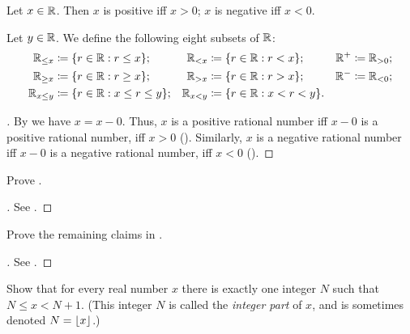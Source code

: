 \begin{ac}\label{i:ac:5.4.3}
  Let \(x \in \mathbb{R}\).
  Then \(x\) is positive iff \(x > 0\);
  \(x\) is negative iff \(x < 0\).

  Let \(y \in \mathbb{R}\).
  We define the following eight subsets of \(\mathbb{R}\):
  \begin{align*}
    \R_{\leq x}   & \coloneqq \set{r \in \R : r \leq x};        & \R_{< x}   & \coloneqq \set{r \in \R : r < x};     & \R^+ & \coloneqq \R_{> 0}; \\
    \R_{\geq x}   & \coloneqq \set{r \in \R : r \geq x};        & \R_{> x}   & \coloneqq \set{r \in \R : r > x};     & \R^- & \coloneqq \R_{< 0}; \\
    \R_{x \leq y} & \coloneqq \set{r \in \R : x \leq r \leq y}; & \R_{x < y} & \coloneqq \set{r \in \R : x < r < y}. &      &
  \end{align*}
\end{ac}

\begin{proof}[]
  By  we have \(x = x - 0\).
  Thus, \(x\) is a positive rational number iff \(x - 0\) is a positive rational number, iff \(x > 0\) ().
  Similarly, \(x\) is a negative rational number iff \(x - 0\) is a negative rational number, iff \(x < 0\) ().
\end{proof}

\exercisesection

\begin{ex}\label{i:ex:5.4.1}
  Prove .
\end{ex}

\begin{proof}[]
  See .
\end{proof}

\begin{ex}\label{i:ex:5.4.2}
  Prove the remaining claims in .
\end{ex}

\begin{proof}[]
  See .
\end{proof}

\begin{ex}\label{i:ex:5.4.3}
  Show that for every real number \(x\) there is exactly one integer \(N\) such that \(N \leq x < N + 1\).
  (This integer \(N\) is called the \emph{integer part} of \(x\), and is sometimes denoted \(N = \left\lfloor x\right\rfloor\).)
\end{ex}

